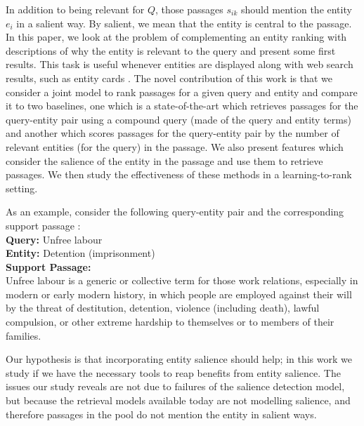 \documentclass[sigconf]{acmart}
\begin{document}
In addition to being relevant for $Q$, those passages $s_{ik}$ should mention the entity $e_i$ in a salient way. By salient, we mean that the entity is central to the passage. %
In this paper, we look at the problem of complementing an entity ranking with descriptions of why the entity is relevant to the query and present some first results. This task is useful whenever entities are displayed along with web search results, such as entity cards \cite{berntson2012providing}. The novel contribution of this work is that we consider a joint model to rank passages for a given query and entity and compare it to two baselines, one which is a state-of-the-art which retrieves passages for the query-entity pair using a compound query (made of the query and entity terms) and another which scores passages for the query-entity pair by the number of relevant entities (for the query) in the passage. We also present features which consider the salience of the entity in the passage and use them to retrieve passages. We then study the effectiveness of these methods in a learning-to-rank \cite{liu2009learning} setting.

As an example, consider the following query-entity pair and the corresponding support passage : \\
\textbf{Query: } Unfree labour \\
\textbf{Entity: } Detention (imprisonment) \\
\textbf{Support Passage: } \\
Unfree labour is a generic or collective term for those work relations, especially in modern or early modern history, in which people are employed against their will by the threat of destitution, detention, violence (including death), lawful compulsion, or other extreme hardship to themselves or to members of their families.

Our hypothesis is that incorporating entity salience should help; in this work we study if we have the necessary tools to reap benefits from entity salience. The issues our study reveals are not due to failures of the salience detection model, but because the retrieval models available today are not modelling salience, and therefore passages in the pool do not mention the entity in salient ways. 
\end{document}
